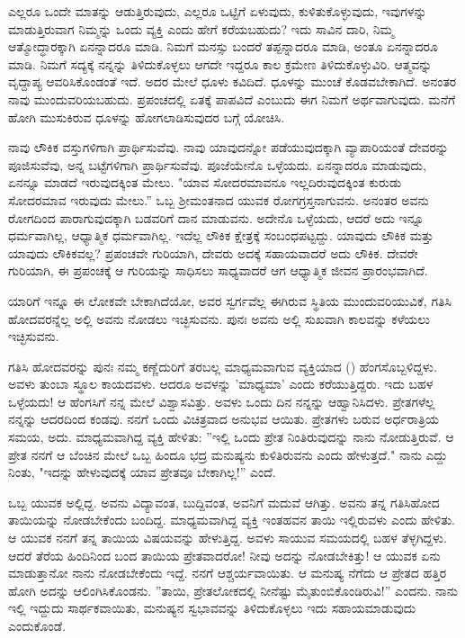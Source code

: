 ಎಲ್ಲರೂ ಒಂದೇ ಮಾತನ್ನು ಆಡುತ್ತಿರುವುದು, ಎಲ್ಲರೂ ಒಟ್ಟಿಗೆ ಏಳುವುದು, ಕುಳಿತುಕೊಳ್ಳುವುದು, ಇವುಗಳನ್ನು ಮಾಡುತ್ತಿರುವಾಗ ನಿಮ್ಮನ್ನು ಒಂದು ವ್ಯಕ್ತಿ ಎಂದು ಹೇಗೆ ಕರೆಯಬಹುದು? ಇದು ಸಾವಿನ ದಾರಿ, ನಿಮ್ಮ ಆತ್ಮೋದ್ಧಾರಕ್ಕಾಗಿ ಏನನ್ನಾದರೂ ಮಾಡಿ. ನಿಮಗೆ ಮನಸ್ಸು ಬಂದರೆ ತಪ್ಪನ್ನಾದರೂ ಮಾಡಿ, ಅಂತೂ ಏನನ್ನಾದರೂ ಮಾಡಿ. ನಿಮಗೆ ಸದ್ಯಕ್ಕೆ ನನ್ನನ್ನು ತಿಳಿದುಕೊಳ್ಳಲು ಆಗದೇ ಇದ್ದರೂ ಕಾಲ ಕ್ರಮೇಣ ತಿಳಿದುಕೊಳ್ಳುವಿರಿ. ಆತ್ಮವನ್ನು ವೃದ್ದಾಪ್ಯ ಆವರಿಸಿಕೊಂಡಂತೆ ಇದೆ. ಅದರ ಮೇಲೆ ಧೂಳು ಕವಿದಿದೆ. ಧೂಳನ್ನು ಮುಂಚೆ ಕೊಡವಬೇಕಾಗಿದೆ. ಅನಂತರ ನಾವು ಮುಂದುವರಿಯಬಹುದು. ಪ್ರಪಂಚದಲ್ಲಿ ಏತಕ್ಕೆ ಪಾಪವಿದೆ ಎಂಬುದು ಈಗ ನಿಮಗೆ ಅರ್ಥವಾಗುವುದು. ಮನೆಗೆ ಹೋಗಿ ಮುಸುಕಿರುವ ಧೂಳನ್ನು ಹೋಗಲಾಡಿಸುವುದರ ಬಗ್ಗೆ ಯೋಚಿಸಿ.

ನಾವು ಲೌಕಿಕ ವಸ್ತುಗಳಿಗಾಗಿ ಪ್ರಾರ್ಥಿಸುವೆವು. ನಾವು ಯಾವುದನ್ನೋ ಪಡೆಯುವುದಕ್ಕಾಗಿ ವ್ಯಾಪಾರಿಯಂತೆ ದೇವರನ್ನು ಪೂಜಿಸುವೆವು, ಅನ್ನ ಬಟ್ಟೆಗಳಿಗಾಗಿ ಪ್ರಾರ್ಥಿಸುವೆವು. ಪೂಜೆಯೇನೊ ಒಳ್ಳೆಯದು. ಏನನ್ನಾದರೂ ಮಾಡುವುದು, ಏನನ್ನೂ ಮಾಡದೆ ಇರುವುದಕ್ಕಿಂತ ಮೇಲು. "ಯಾವ ಸೋದರಮಾವನೂ ಇಲ್ಲದಿರುವುದಕ್ಕಿಂತ ಕುರುಡು ಸೋದರಮಾವ ಇರುವುದು ಮೇಲು.” ಒಬ್ಬ ಶ‍್ರೀಮಂತನಾದ ಯುವಕ ರೋಗಗ್ರಸ್ತನಾಗುವನು. ಅನಂತರ ಅವನು ರೋಗದಿಂದ ಪಾರಾಗುವುದಕ್ಕಾಗಿ ಬಡವರಿಗೆ ದಾನ ಮಾಡುವನು. ಅದೇನೊ ಒಳ್ಳೆಯದು, ಆದರೆ ಅದು ಇನ್ನೂ ಧರ್ಮವಾಗಿಲ್ಲ, ಆಧ್ಯಾತ್ಮಿಕ ಧರ್ಮವಾಗಿಲ್ಲ. ಇದೆಲ್ಲ ಲೌಕಿಕ ಕ್ಷೇತ್ರಕ್ಕೆ ಸಂಬಂಧಪಟ್ಟದ್ದು. ಯಾವುದು ಲೌಕಿಕ ಮತ್ತು ಯಾವುದು ಲೌಕಿಕವಲ್ಲ? ಪ್ರಪಂಚವೇ ಗುರಿಯಾಗಿ, ದೇವರು ಅದಕ್ಕೆ ಸಹಾಯವಾದರೆ ಅದು ಲೌಕಿಕ. ದೇವರೇ ಗುರಿಯಾಗಿ, ಈ ಪ್ರಪಂಚಕ್ಕೆ ಆ ಗುರಿಯನ್ನು ಸಾಧಿಸಲು ಸಾಧ್ಯವಾದರೆ ಆಗ ಆಧ್ಯಾತ್ಮಿಕ ಜೀವನ ಪ್ರಾರಂಭವಾಗಿದೆ.

ಯಾರಿಗೆ ಇನ್ನೂ ಈ ಲೋಕವೇ ಬೇಕಾಗಿದೆಯೋ, ಅವರ ಸ್ವರ್ಗವೆಲ್ಲ ಈಗಿರುವ ಸ್ಥಿತಿಯ ಮುಂದುವರಿಯುವಿಕೆ, ಗತಿಸಿ ಹೋದವರನ್ನೆಲ್ಲ ಅಲ್ಲಿ ಅವನು ನೋಡಲು ಇಚ್ಛಿಸುವನು. ಪುನಃ ಅವನು ಅಲ್ಲಿ ಸುಖವಾಗಿ ಕಾಲವನ್ನು ಕಳೆಯಲು ಇಚ್ಛಿಸುವನು.

ಗತಿಸಿ ಹೋದವರನ್ನು ಪುನಃ ನಮ್ಮ ಕಣ್ಣೆದುರಿಗೆ ತರಬಲ್ಲ ಮಾಧ್ಯಮವಾಗುವ ವ್ಯಕ್ತಿಯಾದ () ಹೆಂಗಸೊಬ್ಬಳಿದ್ದಳು. ಅವಳು ತುಂಬಾ ಸ್ಥೂಲ ಕಾಯದವಳು. ಆದರೂ ಅವಳನ್ನು 'ಮಾಧ್ಯಮಾ' ಎಂದು ಕರೆಯುತ್ತಿದ್ದರು. ಇದು ಬಹಳ ಒಳ್ಳೆಯದು! ಆ ಹೆಂಗಸಿಗೆ ನನ್ನ ಮೇಲೆ ವಿಶ್ವಾಸವಿತ್ತು. ಅವಳು ಒಂದು ದಿನ ನನ್ನನ್ನು ಆಹ್ವಾನಿಸಿದಳು. ಪ್ರೇತಗಳೆಲ್ಲ ನನ್ನನ್ನು ಆದರದಿಂದ ಕಂಡವು. ನನಗೆ ಒಂದು ವಿಚಿತ್ರವಾದ ಅನುಭವ ಆಯಿತು. ಪ್ರೇತಗಳು ಬರುವ ಅರ್ಧರಾತ್ರಿಯ ಸಮಯ, ಅದು. ಮಾಧ್ಯಮವಾಗಿದ್ದ ವ್ಯಕ್ತಿ ಹೇಳಿತು: ''ಇಲ್ಲಿ ಒಂದು ಪ್ರೇತ ನಿಂತಿರುವುದನ್ನು ನಾನು ನೋಡುತ್ತಿರುವೆ. ಆ ಪ್ರೇತ ನನಗೆ ಆ ಬೆಂಚಿನ ಮೇಲೆ ಒಬ್ಬ ಹಿಂದೂ ಭದ್ರ ಮನುಷ್ಯನು ಕುಳಿತಿರುವನು ಎಂದು ಹೇಳುತ್ತದೆ." ನಾನು ಎದ್ದು ನಿಂತು, "ಇದನ್ನು ಹೇಳುವುದಕ್ಕೆ ಯಾವ ಪ್ರೇತವೂ ಬೇಕಾಗಿಲ್ಲ!” ಎಂದೆ.

ಒಬ್ಬ ಯುವಕ ಅಲ್ಲಿದ್ದ. ಅವನು ವಿದ್ಯಾವಂತ, ಬುದ್ದಿವಂತ, ಅವನಿಗೆ ಮದುವೆ ಆಗಿತ್ತು. ಅವನು ತನ್ನ ಗತಿಸಿಹೋದ ತಾಯಿಯನ್ನು ನೋಡಬೇಕೆಂದು ಬಂದಿದ್ದ. ಮಾಧ್ಯಮವಾಗಿದ್ದ ವ್ಯಕ್ತಿ ಇಂತಹವನ ತಾಯಿ ಇಲ್ಲಿರುವಳು ಎಂದು ಹೇಳಿತು. ಆ ಯುವಕ ನನಗೆ ತನ್ನ ತಾಯಿಯ ವಿಷಯವನ್ನು ಹೇಳುತ್ತಿದ್ದ. ಅವಳು ಸಾಯುವ ಸಮಯದಲ್ಲಿ ಬಹಳ ತೆಳ್ಳಗಿದ್ದಳು. ಆದರೆ ತೆರೆಯ ಹಿಂದಿನಿಂದ ಬಂದ ತಾಯಿಯ ಪ್ರೇತವಾದರೋ! ನೀವು ಅದನ್ನು ನೋಡಬೇಕಿತ್ತು! ಆ ಯುವಕ ಏನು ಮಾಡುತ್ತಾನೋ ನಾನು ನೋಡಬೇಕೆಂದು ಇದ್ದೆ. ನನಗೆ ಆಶ್ಚರ್ಯವಾಯಿತು. ಆ ಮನುಷ್ಯ ನೆಗೆದು ಆ ಪ್ರೇತದ ಹತ್ತಿರ ಹೋಗಿ ಅದನ್ನು ಆಲಿಂಗಿಸಿಕೊಂಡನು. ''ತಾಯಿ, ಪ್ರೇತಲೋಕದಲ್ಲಿ ನೀನೆಷ್ಟು ಮೈತುಂಬಿಕೊಂಡಿರುವಿ!” ಎಂದನು. ನಾನು ಇಲ್ಲಿ ಇದ್ದುದು ಸಾರ್ಥಕವಾಯಿತು, ಮನುಷ್ಯನ ಸ್ವಭಾವವನ್ನು ತಿಳಿದುಕೊಳ್ಳಲು ಇದು ಸಹಾಯಮಾಡುವುದು ಎಂದುಕೊಂಡೆ.

